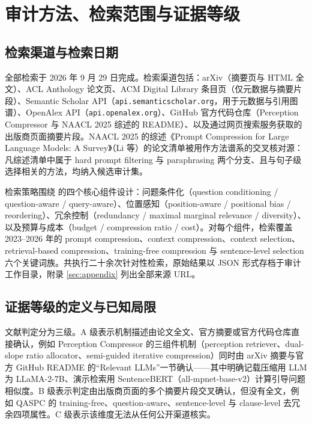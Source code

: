 \section{审计方法、检索范围与证据等级}

\subsection{检索渠道与检索日期}

全部检索于 2026 年 9 月 29 日完成。检索渠道包括：arXiv（摘要页与 HTML 全文）、ACL Anthology 论文页、ACM Digital Library 条目页（仅元数据与摘要片段）、Semantic Scholar API（\texttt{api.semanticscholar.org}，用于元数据与引用图谱）、OpenAlex API（\texttt{api.openalex.org}）、GitHub 官方代码仓库（Perception Compressor 与 NAACL 2025 综述的 README）、以及通过网页搜索服务获取的出版商页面摘要片段。NAACL 2025 的综述《Prompt Compression for Large Language Models: A Survey》（Li 等）的论文清单被用作方法谱系的交叉核对源：凡综述清单中属于 hard prompt filtering 与 paraphrasing 两个分支、且与句子级选择相关的方法，均纳入候选审计集。

检索策略围绕 \sieve{} 的四个核心组件设计：问题条件化（question conditioning / question-aware / query-aware）、位置感知（position-aware / positional bias / reordering）、冗余控制（redundancy / maximal marginal relevance / diversity）、以及预算与成本（budget / compression ratio / cost）。对每个组件，检索覆盖 2023--2026 年的 prompt compression、context compression、context selection、retrieval-based compression、training-free compression 与 sentence-level selection 六个关键词族。共执行二十余次针对性检索，原始结果以 JSON 形式存档于审计工作目录，附录 \ref{sec:appendix} 列出全部来源 URL。

\subsection{证据等级的定义与已知局限}

文献判定分为三级。A 级表示机制描述由论文全文、官方摘要或官方代码仓库直接确认，例如 Perception Compressor 的三组件机制（perception retriever、dual-slope ratio allocator、semi-guided iterative compression）同时由 arXiv 摘要与官方 GitHub README 的``Relevant LLMs''一节确认——其中明确记载压缩用 LLM 为 LLaMA-2-7B、演示检索用 SentenceBERT（all-mpnet-base-v2）计算引导问题相似度。B 级表示判定由出版商页面的多个摘要片段交叉确认，但没有全文，例如 QASPC 的 training-free、question-aware、sentence-level 与 clause-level 去冗余四项属性。C 级表示该维度无法从任何公开渠道核实。

